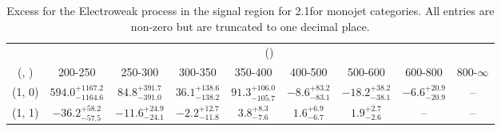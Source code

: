 \begin{table}[h!]
\tiny
\centering
\caption{Excess for the Electroweak process in the signal region for 2.1\ifb for monojet categories. All entries are non-zero but are truncated to one decimal place.\label{tab:excesssepnaive_sig_ewk_mono}}
\begin{tabular}
{ccccccccc}
	\hline\hline
	& \multicolumn{8}{c}{\scalht (\gev)} \\ 
	 (\njet,  \nb) & 200-250 & 250-300 & 300-350 & 350-400 & 400-500 & 500-600 & 600-800 & 800-$\infty$ \\ [0.8ex] 
\hline
	(1, 0) & $594.0^{+ 1167.2 }_{- 1164.6 }$ & $84.8^{+ 391.7 }_{- 391.0 }$ & $36.1^{+ 138.6 }_{- 138.2 }$ & $91.3^{+ 106.0 }_{- 105.7 }$ & $-8.6^{+ 83.2 }_{- 83.1 }$ & $-18.2^{+ 38.2 }_{- 38.1 }$ & $-6.6^{+ 20.9 }_{- 20.9 }$ & -- \\[0.5ex] 
	(1, 1) & $-36.2^{+ 58.2 }_{- 57.5 }$ & $-11.6^{+ 24.9 }_{- 24.1 }$ & $-2.2^{+ 12.7 }_{- 11.8 }$ & $3.8^{+ 8.3 }_{- 7.6 }$ & $1.6^{+ 6.9 }_{- 6.7 }$ & $1.9^{+ 2.7 }_{- 2.6 }$ & -- & -- \\[0.5ex] 
	\hline
	\hline
\end{tabular}
\end{table}
